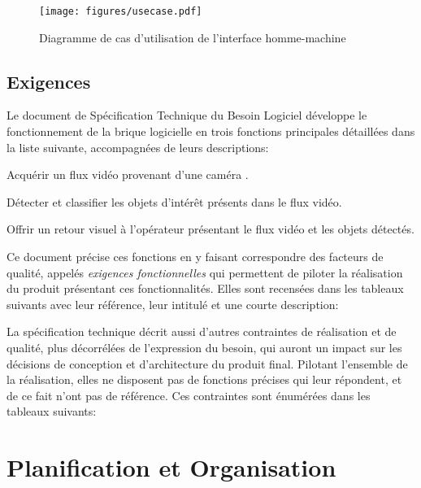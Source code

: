 			\begin{figure}[h]
			{
				\centering
				\texttt{[image: figures/usecase.pdf]}
				\caption{Diagramme de cas d'utilisation de l'interface homme-machine}
				\label{fig:usecase}
			}
			\end{figure}

		\subsection{Exigences}

			Le document de Spécification Technique du Besoin Logiciel développe le fonctionnement de la brique logicielle en trois fonctions principales détaillées dans la liste suivante, accompagnées de leurs descriptions:
			\begin{description}[noitemsep, before={\setcounter{descriptcount}{0}},font=\bfseries\stepcounter{descriptcount}\thedescriptcount.~]
				\item[Acquisition Vidéo:] Acquérir un flux vidéo provenant d’une caméra \degre.
				\item[Détection:] Détecter et classifier les objets d’intérêt présents dans le flux vidéo.
				\item[Retour visuel:] Offrir un retour visuel à l’opérateur présentant le flux vidéo et les objets détectés.
			\end{description}
			Ce document précise ces fonctions en y faisant correspondre des facteurs de qualité, appelés \emph{exigences fonctionnelles} qui permettent de piloter la réalisation du produit présentant ces fonctionnalités. Elles sont recensées dans les tableaux suivants avec leur référence, leur intitulé et une courte description:
			
			
			\bigskip

			La spécification technique décrit aussi d'autres contraintes de réalisation et de qualité, plus décorrélées de l'expression du besoin, qui auront un impact sur les décisions de conception et d'architecture du produit final. Pilotant l'ensemble de la réalisation, elles ne disposent pas de fonctions précises qui leur répondent, et de ce fait n'ont pas de référence. Ces contraintes sont énumérées dans les tableaux suivants:
			
			
			
	\section{Planification et Organisation}

